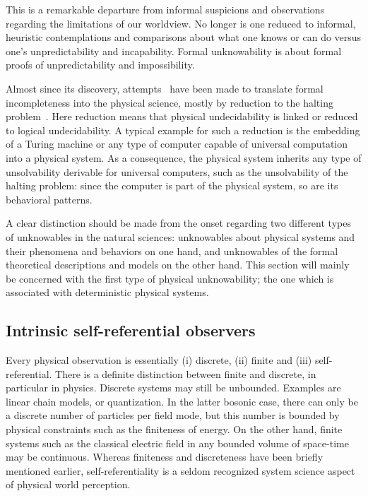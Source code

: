 \documentclass[rmp,amsfonts,showpacs,showkeys,twocolumn]{revtex4}
\begin{document}
This is a remarkable departure from informal suspicions and observations regarding the limitations
of our worldview.
No longer is one reduced to informal, heuristic contemplations and comparisons about what one knows or can do versus
one's unpredictability and incapability.
Formal unknowability is about formal proofs of unpredictability and impossibility.

Almost since its discovery, attempts~\cite{popper-50i,popper-50ii} have been made to translate
formal incompleteness into the physical science,
mostly by reduction to the halting problem~\cite{moore,casti:94-onlimits_book,casti:96-onlimits}.
Here reduction means that physical undecidability is linked or reduced to logical undecidability.
A typical example for such a reduction is the embedding of a Turing machine or any type of computer capable of
universal computation into a physical system.
As a consequence, the physical system inherits
any type of unsolvability derivable for universal computers, such as the
unsolvability of the halting problem:
since the computer is part of the physical system, so are its behavioral patterns.


A clear distinction should be made from the onset regarding two different types of unknowables in
the natural sciences: unknowables about physical systems and their phenomena and behaviors on one hand,
and unknowables of the formal theoretical descriptions and models on the other hand.
This section will mainly be concerned with the first type of physical unknowability;
the one which is associated with deterministic physical systems.





\subsection{Intrinsic self-referential observers}



Every physical observation is essentially (i) discrete, (ii) finite and (iii) self-referential.
There is a definite distinction between finite and discrete, in particular in physics.
Discrete systems may still be unbounded. Examples are linear chain models, or quantization.
In the latter bosonic case, there can only be a discrete number of particles per field mode,
but this number is bounded by physical constraints such as the finiteness of energy.
On the other hand, finite systems such as the classical electric field in any bounded volume
of space-time may be continuous.
Whereas finiteness and discreteness have been briefly mentioned earlier,
self-referentiality is a seldom recognized system science aspect of physical world perception.
\end{document}
